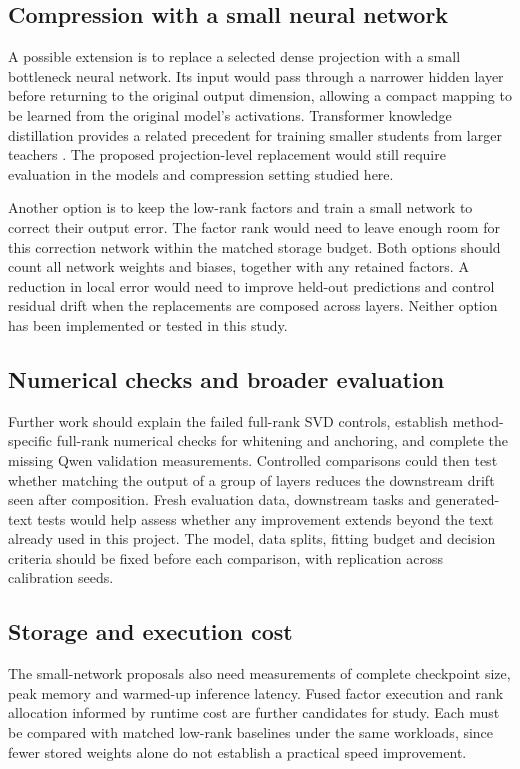 \documentclass[conference]{IEEEtran}
\begin{document}
\subsection{Compression with a small neural network}
A possible extension is to replace a selected dense projection with a small bottleneck neural network. Its input would pass through a narrower hidden layer before returning to the original output dimension, allowing a compact mapping to be learned from the original model's activations. Transformer knowledge distillation provides a related precedent for training smaller students from larger teachers \cite{jiao2020tinybert}. The proposed projection-level replacement would still require evaluation in the models and compression setting studied here.\par\smallskip
Another option is to keep the low-rank factors and train a small network to correct their output error. The factor rank would need to leave enough room for this correction network within the matched storage budget. Both options should count all network weights and biases, together with any retained factors. A reduction in local error would need to improve held-out predictions and control residual drift when the replacements are composed across layers. Neither option has been implemented or tested in this study.\par\smallskip
\subsection{Numerical checks and broader evaluation}
Further work should explain the failed full-rank SVD controls, establish method-specific full-rank numerical checks for whitening and anchoring, and complete the missing Qwen validation measurements. Controlled comparisons could then test whether matching the output of a group of layers reduces the downstream drift seen after composition. Fresh evaluation data, downstream tasks and generated-text tests would help assess whether any improvement extends beyond the text already used in this project. The model, data splits, fitting budget and decision criteria should be fixed before each comparison, with replication across calibration seeds.\par\smallskip
\subsection{Storage and execution cost}
The small-network proposals also need measurements of complete checkpoint size, peak memory and warmed-up inference latency. Fused factor execution and rank allocation informed by runtime cost are further candidates for study. Each must be compared with matched low-rank baselines under the same workloads, since fewer stored weights alone do not establish a practical speed improvement.\par\smallskip
\end{document}
